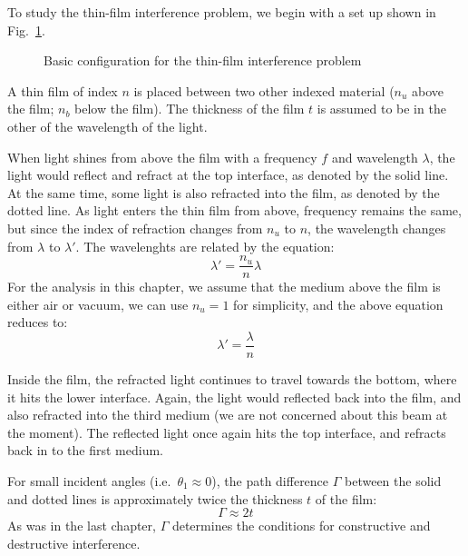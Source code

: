 To study the thin-film interference problem, we begin with a set up shown in
Fig.~\ref{fig:thin-film1}.
\begin{figure}[ht]
  \centering
  \caption{Basic configuration for the thin-film interference problem}
  \label{fig:thin-film1}
\end{figure}
A thin film of index $n$ is placed between two other indexed material ($n_u$
above the film; $n_b$ below the film). The thickness of the film $t$ is assumed
to be in the other of the wavelength of the light.

When light shines from above the film with a frequency $f$ and wavelength
$\lambda$, the light would reflect and refract at the top interface, as denoted
by the solid line. At the same time, some light is also refracted into the
film, as denoted by the dotted line. As light enters the thin film from above,
frequency remains the same, but since the index of refraction changes from
$n_u$ to $n$, the wavelength changes from $\lambda$ to $\lambda'$. The
wavelenghts are related by the equation:
\begin{equation*}
  \lambda'=\frac{n_u}n\lambda
\end{equation*}
For the analysis in this chapter, we assume that the medium above the film is
either air or vacuum, we can use $n_u=1$ for simplicity, and the above equation
reduces to:
\begin{equation}
  \lambda'=\frac\lambda{n}
\end{equation}

Inside the film, the refracted light continues to travel towards the bottom,
where it hits the lower interface. Again, the light would reflected back into
the film, and also refracted into the third medium (we are not concerned about
this beam at the moment). The reflected light once again hits the top
interface, and refracts back in to the first medium.

For small incident angles (i.e.\ $\theta_1\approx 0$), the path difference
$\Gamma$ between the solid and dotted lines is approximately twice the
thickness $t$ of the film:
\begin{equation*}
  \Gamma\approx2t
\end{equation*}
As was in the last chapter, $\Gamma$ determines the conditions for
constructive and destructive interference.




